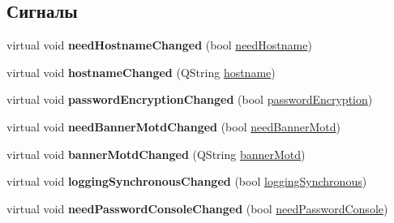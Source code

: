 \subsection*{Сигналы}
\begin{DoxyCompactItemize}
\item 
virtual void {\bfseries need\+Hostname\+Changed} (bool \hyperlink{class_network_equipment_model_a67cb5cf3284a19a1a0d6a7b22fa2a91e}{need\+Hostname})\hypertarget{class_network_equipment_model_a8c4c355442953dd22990b55eff5d1c87}{}\label{class_network_equipment_model_a8c4c355442953dd22990b55eff5d1c87}

\item 
virtual void {\bfseries hostname\+Changed} (Q\+String \hyperlink{class_network_equipment_model_a59f5581ce5f16229235bc9ace24e11d6}{hostname})\hypertarget{class_network_equipment_model_a022d6ce226b046705de3a2c1fd430e33}{}\label{class_network_equipment_model_a022d6ce226b046705de3a2c1fd430e33}

\item 
virtual void {\bfseries password\+Encryption\+Changed} (bool \hyperlink{class_network_equipment_model_a46900023e99e2791d5e0ff85204f25fb}{password\+Encryption})\hypertarget{class_network_equipment_model_ab8312ba3ebe2b6d3af20ebdafd90ec17}{}\label{class_network_equipment_model_ab8312ba3ebe2b6d3af20ebdafd90ec17}

\item 
virtual void {\bfseries need\+Banner\+Motd\+Changed} (bool \hyperlink{class_network_equipment_model_ab20b1087ae50a8546bdabfa598e8c647}{need\+Banner\+Motd})\hypertarget{class_network_equipment_model_ae4c88d5f5818022382a52b06e8d2fe73}{}\label{class_network_equipment_model_ae4c88d5f5818022382a52b06e8d2fe73}

\item 
virtual void {\bfseries banner\+Motd\+Changed} (Q\+String \hyperlink{class_network_equipment_model_a9256503fdb609788939777565574ae7c}{banner\+Motd})\hypertarget{class_network_equipment_model_a58ccbc2eadc43659e365316ad617ea18}{}\label{class_network_equipment_model_a58ccbc2eadc43659e365316ad617ea18}

\item 
virtual void {\bfseries logging\+Synchronous\+Changed} (bool \hyperlink{class_network_equipment_model_a7321ba74141fd1bc694a6607363625ae}{logging\+Synchronous})\hypertarget{class_network_equipment_model_a2f68757692a19aa6ead965f5d9850dbd}{}\label{class_network_equipment_model_a2f68757692a19aa6ead965f5d9850dbd}

\item 
virtual void {\bfseries need\+Password\+Console\+Changed} (bool \hyperlink{class_network_equipment_model_ada70138a6ca4a8ad1bd07fa48998c9d8}{need\+Password\+Console})\hypertarget{class_network_equipment_model_a1f0f610dad382795f3c18e01090bda98}{}\label{class_network_equipment_model_a1f0f610dad382795f3c18e01090bda98}


\end{DoxyCompactItemize}
